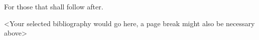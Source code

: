\documentclass[letterpaper,10pt]{article} %
\begin{document}
\begin{dedication}
For those that shall follow after.
\end{dedication}\newpage


\bodymatter     %









\backmatter     %



\cleardoublepage
\begin{selected-bibliography}
<Your selected bibliography would go here, a page break might also be necessary above>
\end{selected-bibliography}

\end{document}
